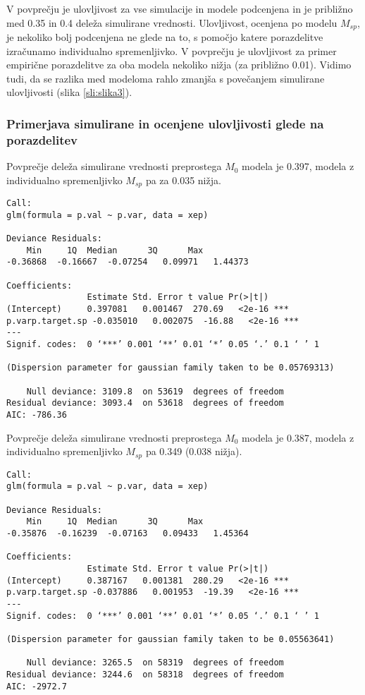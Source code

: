 V povprečju je ulovljivost za vse simulacije in modele podcenjena in je približno med 0.35 in 0.4 deleža simulirane vrednosti. Ulovljivost, ocenjena po modelu $M_{sp}$, je nekoliko bolj podcenjena ne glede na to, s pomočjo katere porazdelitve izračunamo individualno spremenljivko. V povprečju je ulovljivost za primer empirične porazdelitve za oba modela nekoliko nižja (za približno 0.01). Vidimo tudi, da se razlika med modeloma rahlo zmanjša s povečanjem simulirane ulovljivosti (slika \ref{sli:slika3}).

\subsubsection[\bfseries Primerjava simulirane in ocenjene ulovljivosti glede na porazdelitev]{Primerjava simulirane in ocenjene ulovljivosti glede na porazdelitev}
Povprečje deleža simulirane vrednosti preprostega $M_0$ modela je 0.397, modela z individualno spremenljivko $M_{sp}$ pa za 0.035 nižja.

\begin{verbatim}
Call:
glm(formula = p.val ~ p.var, data = xep)

Deviance Residuals:
 	Min    	1Q	Median    	3Q   	Max
-0.36868  -0.16667  -0.07254   0.09971   1.44373

Coefficients:
              	Estimate Std. Error t value Pr(>|t|)
(Intercept)   	0.397081   0.001467  270.69   <2e-16 ***
p.varp.target.sp -0.035010   0.002075  -16.88   <2e-16 ***
---
Signif. codes:  0 ‘***’ 0.001 ‘**’ 0.01 ‘*’ 0.05 ‘.’ 0.1 ‘ ’ 1

(Dispersion parameter for gaussian family taken to be 0.05769313)

	Null deviance: 3109.8  on 53619  degrees of freedom
Residual deviance: 3093.4  on 53618  degrees of freedom
AIC: -786.36
\end{verbatim}

Povprečje deleža simulirane vrednosti preprostega $M_0$ modela je 0.387, modela z individualno spremenljivko $M_{sp}$ pa 0.349 (0.038 nižja).

\begin{verbatim}
Call:
glm(formula = p.val ~ p.var, data = xep)

Deviance Residuals:
 	Min    	1Q	Median    	3Q   	Max
-0.35876  -0.16239  -0.07163   0.09433   1.45364

Coefficients:
              	Estimate Std. Error t value Pr(>|t|)
(Intercept)   	0.387167   0.001381  280.29   <2e-16 ***
p.varp.target.sp -0.037886   0.001953  -19.39   <2e-16 ***
---
Signif. codes:  0 ‘***’ 0.001 ‘**’ 0.01 ‘*’ 0.05 ‘.’ 0.1 ‘ ’ 1

(Dispersion parameter for gaussian family taken to be 0.05563641)

	Null deviance: 3265.5  on 58319  degrees of freedom
Residual deviance: 3244.6  on 58318  degrees of freedom
AIC: -2972.7
\end{verbatim}


